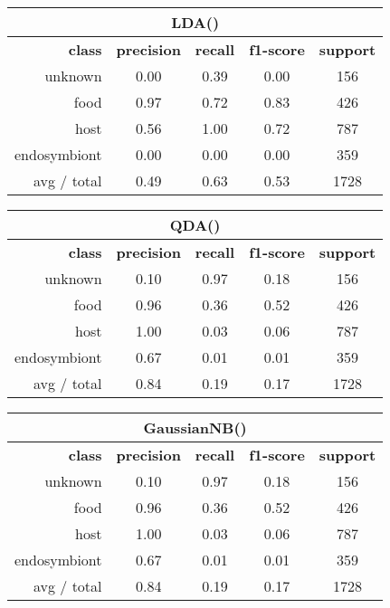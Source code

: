 \begin{table}
	\begin{tabular}{|r|c|c|c|c|}
		\hline
		\multicolumn{5}{c}{LDA()}\\
		\hline
		\textbf{class}		& \textbf{precision}  &  \textbf{recall}  & \textbf{f1-score}  &  \textbf{support} \\
		unknown   	&    0.00 	 &   0.39   &    0.00   &   156   \\
		food      	&    0.97 	 &   0.72  &    0.83   &   426   \\
		host      	&    0.56    &   1.00   &    0.72   &   787   \\
		endosymbiont&    0.00    &   0.00   &    0.00   &   359   \\
		\hline
		avg / total &    0.49    &   0.63   &    0.53   &   1728  \\
		\hline
	\end{tabular}
\end{table}

\begin{table}
	\begin{tabular}{|r|c|c|c|c|}
		\hline
		\multicolumn{5}{c}{QDA()}\\
		\hline
		\textbf{class}		& \textbf{precision}  &  \textbf{recall}  & \textbf{f1-score}  &  \textbf{support} \\
		unknown   	&    0.10 	 &   0.97   &    0.18   &   156   \\
		food      	&    0.96 	 &   0.36   &    0.52   &   426   \\
		host      	&    1.00    &   0.03   &    0.06   &   787   \\
		endosymbiont&    0.67    &   0.01   &    0.01   &   359   \\
		\hline
		avg / total &    0.84    &   0.19   &    0.17   &   1728  \\
		\hline
	\end{tabular}
\end{table}



\begin{table}
	\begin{tabular}{|r|c|c|c|c|}
		\hline
		\multicolumn{5}{c}{GaussianNB()}\\
		\hline
		\textbf{class}		& \textbf{precision}  &  \textbf{recall}  & \textbf{f1-score}  &  \textbf{support} \\
		unknown   	&    0.10 	 &   0.97   &    0.18   &   156   \\
		food      	&    0.96 	 &   0.36   &    0.52   &   426   \\
		host      	&    1.00    &   0.03   &    0.06   &   787   \\
		endosymbiont&    0.67    &   0.01   &    0.01   &   359   \\
		\hline
		avg / total &    0.84    &   0.19   &    0.17   &   1728  \\
		\hline
	\end{tabular}
\end{table}



